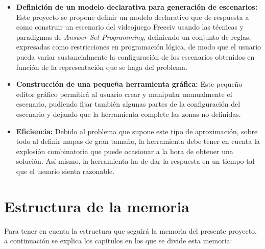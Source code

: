\begin{itemize}
	\item \textbf{Definición de un modelo declarativa para generación de escenarios:} Este proyecto se propone definir un modelo declarativo que de respuesta a como construir un escenario del videojuego Freeciv usando las técnicas y paradigmas de \textit{Answer Set Programming}, definiendo un conjunto de reglas, expresadas como restricciones en programación lógica, de modo que el usuario pueda variar sustancialmente la configuración de los escenarios obtenidos en función de la representación que se haga del problema.
	\item \textbf{Construcción de una pequeña herramienta gráfica:} Este pequeño editor gráfico permitirá al usuario crear y manipular manualmente el escenario, pudiendo fijar también algunas partes de la configuración del escenario y dejando que la herramienta complete las zonas no definidas.
	\item \textbf{Eficiencia:} Debido al problema que supone este tipo de aproximación, sobre todo al definir mapas de gran tamaño, la herramienta debe tener en cuenta la explosión combinatoria que puede ocasionar a la hora de obtener una solución. Así mismo, la herramienta ha de dar la respuesta en un tiempo tal que el usuario sienta razonable.
\end{itemize}

\section{Estructura de la memoria}

Para tener en cuenta la estructura que seguirá la memoria del presente proyecto, a continuación se explica los capítulos en los que se divide esta memoria:

